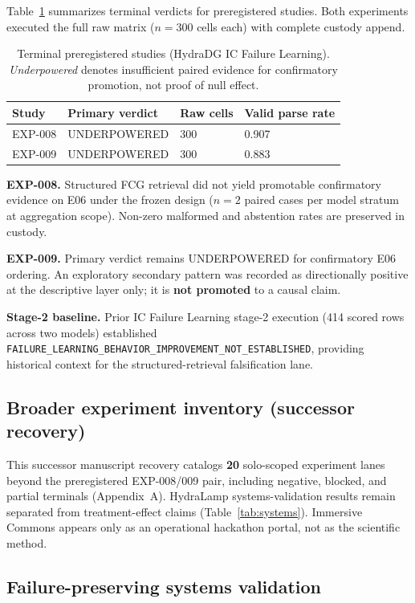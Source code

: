 \documentclass{article}
\begin{document}
Table~\ref{tab:terminal} summarizes terminal verdicts for preregistered studies.
Both experiments executed the full raw matrix ($n=300$ cells each) with complete custody append.

\begin{table}[t]
  \centering
  \caption{Terminal preregistered studies (HydraDG IC Failure Learning). \emph{Underpowered} denotes insufficient paired evidence for confirmatory promotion, not proof of null effect.}
  \label{tab:terminal}
  \begin{tabular}{llll}
    \toprule
    Study & Primary verdict & Raw cells & Valid parse rate \\
    \midrule
    EXP-008 & UNDERPOWERED & 300 & 0.907 \\
    EXP-009 & UNDERPOWERED & 300 & 0.883 \\
    \bottomrule
  \end{tabular}
\end{table}

\textbf{EXP-008.} Structured FCG retrieval did not yield promotable confirmatory evidence on E06 under the frozen design ($n=2$ paired cases per model stratum at aggregation scope). Non-zero malformed and abstention rates are preserved in custody.

\textbf{EXP-009.} Primary verdict remains UNDERPOWERED for confirmatory E06 ordering. An exploratory secondary pattern was recorded as directionally positive at the descriptive layer only; it is \textbf{not promoted} to a causal claim.

\textbf{Stage-2 baseline.} Prior IC Failure Learning stage-2 execution (414 scored rows across two models) established \texttt{FAILURE\_LEARNING\_BEHAVIOR\_IMPROVEMENT\_NOT\_ESTABLISHED}, providing historical context for the structured-retrieval falsification lane.


\subsection{Broader experiment inventory (successor recovery)}
This successor manuscript recovery catalogs \textbf{20} solo-scoped experiment lanes beyond the preregistered EXP-008/009 pair, including negative, blocked, and partial terminals (Appendix~A).
HydraLamp systems-validation results remain separated from treatment-effect claims (Table~\ref{tab:systems}).
Immersive Commons appears only as an operational hackathon portal, not as the scientific method.

\subsection{Failure-preserving systems validation}
\end{document}
